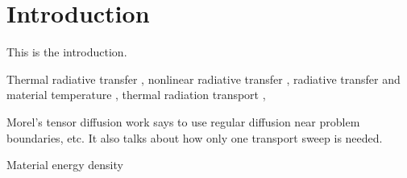 
\chapter{Introduction}
This is the introduction.

Thermal radiative transfer \cite{Urb2006,McC2008a}, nonlinear radiative transfer
\cite{Den2009}, radiative transfer and material temperature
\cite{Gen2001,Mor2000}, thermal radiation transport \cite{McC2007,Dav2010},

Morel's tensor diffusion work \cite{Mor2007} says to use regular diffusion near
problem boundaries, etc. It also talks about how only one transport sweep is
needed.

Material energy density \cite{Su2001}

